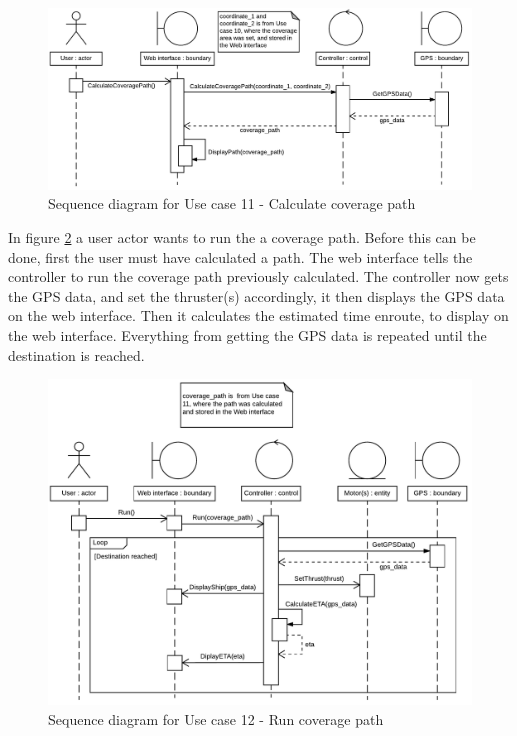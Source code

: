 \begin{figure}[H]
	\centering
	\includegraphics[width=1\linewidth]{Images/System_architecture/Use_case_11_SD}
	\caption{Sequence diagram for Use case 11 - Calculate coverage path}
	\label{fig:seq:uc11}
\end{figure}

In figure \ref{fig:seq:uc12} a user actor wants to run the a coverage path. Before this can be done, first the user must have calculated a path. The web interface tells the controller to run the coverage path previously calculated. The controller now gets the GPS data, and set the thruster(s) accordingly, it then displays the GPS data on the web interface. Then it calculates the estimated time enroute, to display on the web interface. Everything from getting the GPS data is repeated until the destination is reached.

\begin{figure}[H]
	\centering
	\includegraphics[width=1\linewidth]{Images/System_architecture/Use_case_12_SD}
	\caption{Sequence diagram for Use case 12 - Run coverage path}
	\label{fig:seq:uc12}
\end{figure}

